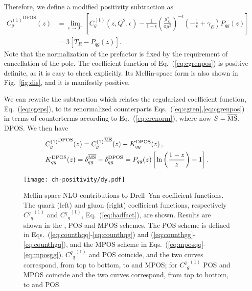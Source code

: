 Therefore, we define a modified positivity subtraction as
\begin{align}\label{eq:cgrenpos}
  {C^{(1)}_{g}}^{\textrm{DPOS}}(z) &= \lim_{\epsilon\to0^-}
  \left[{C^{(1)}_{g}}(z,Q^2,\epsilon) - \frac{1}{1-\epsilon}\left(\frac{\mu_D^2}{\pi\mu^2}\right)^{-\epsilon} \left(-\frac 1
    {\epsilon}+\gamma_E\right) P_{qg}(z)\right]\\\label{eq:cgrenpos1}
    &= 3\left[T_R- P_{qg}(z)\right].
\end{align}
Note that the normalization of the prefactor is fixed by the
requirement of cancellation of the pole.
The coefficient function of Eq.~(\ref{eq:cgrenpos}) is positive definite,
as it is easy to check explicitly. Its Mellin-space form is also shown
in Fig.~\ref{fig:dis}, and it is manifestly positive.

We
can rewrite the subtraction which relates  the regularized
coefficient function, Eq.~(\ref{eq:cgeps}), to its renormalized
counterparts Eqs.~(\ref{eq:cgren},\ref{eq:cgrenpos}) in terms of
counterterms according to Eq.~(\ref{eq:crenorm}), where now
$S={\overline{\textrm{{MS}}}}$, DPOS.
We then have 
\begin{align}\label{eq:count}
  &   {C^{(1)}_{g}}^{\textrm{DPOS}}(z) =  {C^{(1)}_{g}}^{{\overline{\textrm{{MS}}}}}(z) -
  K_{qg}^{\textrm{DPOS}}(z) \,,\\ \label{eq:count1}
  &  K_{qg}^{\textrm{DPOS}}(z)=\delta_{qg}^{{\overline{\textrm{{MS}}}}}-\delta_{qg}^{\textrm{DPOS}}=  P_{qg}(z)\left[\ln\left(\frac{1-z}{z}\right) - 1\right].
\end{align}


\begin{figure}[t]
  \begin{center}
    \texttt{[image: ch-positivity/dy.pdf]}
    \caption{\small Mellin-space NLO contributions to Drell--Yan coefficient
      functions. The quark (left) and gluon (right) coefficient
      functions, respectively  ${{{C^q}_q}^{(1)}}$ and  ${{{C^q}_g}^{(1)}}$, Eq.~(\ref{eq:hadfact}), are
      shown.
      Results are shown in the \msbar{}, POS and MPOS schemes. The POS
      scheme is defined in Eqs.~(\ref{eq:counthqq}-\ref{eq:counthqg})
      and (\ref{eq:counthgg}-\ref{eq:counthgq}), and the MPOS scheme
      in Eqs.~(\ref{eq:mposqq}-\ref{eq:mposgg}).
 ${{{C^q}_q}^{(1)}}$ \msbar{} and POS coincide, and the two curves
      correspond, from top to bottom, to \msbar{} and MPOS; for  
      ${{{C^q}_g}^{(1)}}$ POS and MPOS coincide and the two curves
      correspond, from top to bottom, to \msbar{} and POS. 
    \label{fig:dy} }
  \end{center}
\end{figure}
